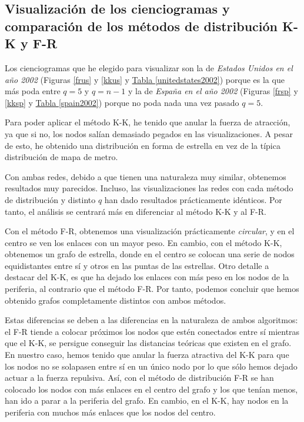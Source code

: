 \documentclass[10pt,a4paper,spanish]{article}
\numberwithin{equation}{section} %
\numberwithin{figure}{section} %
\numberwithin{table}{section} %
\begin{document}
\subsection{Visualización de los cienciogramas y comparación de los métodos de distribución K-K y F-R}

Los cienciogramas que he elegido para visualizar son la de \textit{Estados Unidos en el año 2002} (Figuras \hyperref[frus]{\ref*{frus}} y \hyperref[kkus]{\ref*{kkus}} y \hyperref[unitedstates2002]{Tabla \ref*{unitedstates2002}}) porque es la que más poda entre $q = 5$ y $q = n-1$ y la de \textit{España en el año 2002} (Figuras \hyperref[frsp]{\ref*{frsp}} y \hyperref[kksp]{\ref*{kksp}} y \hyperref[spain2002]{Tabla \ref*{spain2002}}) porque no poda nada una vez pasado $q = 5$.

Para poder aplicar el método K-K, he tenido que anular la fuerza de atracción, ya que si no, los nodos salían demasiado pegados en las visualizaciones. A pesar de esto, he obtenido una distribución en forma de estrella en vez de la típica distribución de mapa de metro.

Con ambas redes, debido a que tienen una naturaleza muy similar, obtenemos resultados muy parecidos. Incluso, las visualizaciones las redes con cada método de distribución y distinto $q$ han dado resultados prácticamente idénticos. Por tanto, el análisis se centrará más en diferenciar al método K-K y al F-R.

Con el método F-R, obtenemos una visualización prácticamente \textit{circular}, y en el centro se ven los enlaces con un mayor peso. En cambio, con el método K-K, obtenemos un grafo de estrella, donde en el centro se colocan una serie de nodos equidistantes entre sí y otros en las puntas de las estrellas. Otro detalle a destacar del K-K, es que ha dejado los enlaces con más peso en los nodos de la periferia, al contrario que el método F-R. Por tanto, podemos concluir que hemos obtenido grafos completamente distintos con ambos métodos.

Estas diferencias se deben a las diferencias en la naturaleza de ambos algoritmos: el F-R tiende a colocar próximos los nodos que estén conectados entre sí mientras que el K-K, se persigue conseguir las distancias teóricas que existen en el grafo. En nuestro caso, hemos tenido que anular la fuerza atractiva del K-K para que los nodos no se solapasen entre sí en un único nodo por lo que sólo hemos dejado actuar a la fuerza repulsiva. Así, con el método de distribución F-R se han colocado los nodos con más enlaces en el centro del grafo y los que tenían menos, han ido a parar a la periferia del grafo. En cambio, en el K-K, hay nodos en la periferia con muchos más enlaces que los nodos del centro.
\end{document}
